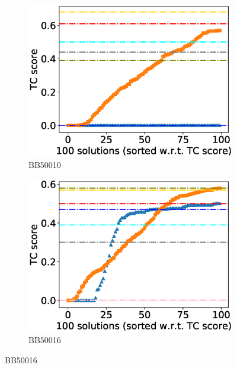 \begin{figure}[!htbp]
\begin{adjustwidth}{-1cm}{-1cm}
		\begin{subfigure}{0.22\textwidth}
			\includegraphics[width=\columnwidth]{Figure/summary/precomputedInit/Balibase/BB50010_tc_density_single_run_2}
			\caption{BB50010}
		\end{subfigure}
		\begin{subfigure}{0.22\textwidth}
			\includegraphics[width=\columnwidth]{Figure/summary/precomputedInit/Balibase/BB50016_tc_density_single_run_2}
			\caption{BB50016}
		\end{subfigure}
		

\end{adjustwidth}
\end{figure}
